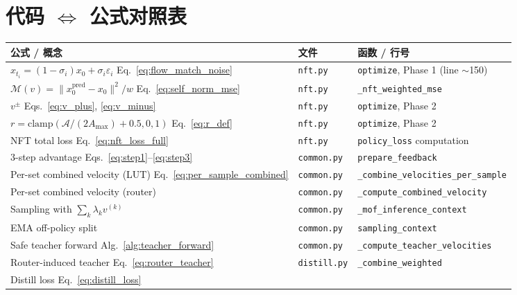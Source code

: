 \documentclass[11pt,a4paper]{article}
\newcommand{\adv}{\mathcal{A}}
\theoremstyle{definition}
\begin{document}
\section{代码 $\Leftrightarrow$ 公式对照表}
\label{sec:code_map}

\begin{center}
\renewcommand{\arraystretch}{1.4}
\footnotesize
\begin{tabular}{@{}p{6.5cm} l p{4cm}@{}}
\toprule
\textbf{公式 / 概念} & \textbf{文件} & \textbf{函数 / 行号} \\
\midrule
$x_{t_i} = (1-\sigma_i)x_0 + \sigma_i \varepsilon_i$ Eq.~\eqref{eq:flow_match_noise}
  & \texttt{nft.py} & \texttt{optimize}, Phase 1 (line $\sim$150) \\
$\mathcal{M}(v) = \|x_0^{\text{pred}}{-}x_0\|^2/w$ Eq.~\eqref{eq:self_norm_mse}
  & \texttt{nft.py} & \texttt{\_nft\_weighted\_mse} \\
$v^\pm$ Eqs.~\eqref{eq:v_plus}, \eqref{eq:v_minus}
  & \texttt{nft.py} & \texttt{optimize}, Phase 2 \\
$r = \mathrm{clamp}(\adv/(2A_{\max}){+}0.5, 0, 1)$ Eq.~\eqref{eq:r_def}
  & \texttt{nft.py} & \texttt{optimize}, Phase 2 \\
NFT total loss Eq.~\eqref{eq:nft_loss_full}
  & \texttt{nft.py} & \texttt{policy\_loss} computation \\
\midrule
3-step advantage Eqs.~\eqref{eq:step1}--\eqref{eq:step3}
  & \texttt{common.py} & \texttt{prepare\_feedback} \\
Per-set combined velocity (LUT) Eq.~\eqref{eq:per_sample_combined}
  & \texttt{common.py} & \texttt{\_combine\_velocities\_per\_sample} \\
Per-set combined velocity (router)
  & \texttt{common.py} & \texttt{\_compute\_combined\_velocity} \\
Sampling with $\sum_k \lambda_k v^{(k)}$
  & \texttt{common.py} & \texttt{\_mof\_inference\_context} \\
EMA off-policy split
  & \texttt{common.py} & \texttt{sampling\_context} \\
Safe teacher forward Alg.~\ref{alg:teacher_forward}
  & \texttt{common.py} & \texttt{\_compute\_teacher\_velocities} \\
\midrule
Router-induced teacher Eq.~\eqref{eq:router_teacher}
  & \texttt{distill.py} & \texttt{\_combine\_weighted} \\
Distill loss Eq.~\eqref{eq:distill_loss}

\end{tabular}
\end{center}
\end{document}
